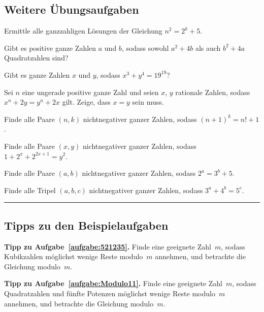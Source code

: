 \subsection*{Weitere Übungsaufgaben}
\begin{aufgabe*}\label{aufgabe:501044}
	Ermittle alle ganzzahligen Lösungen der Gleichung $n^2=2^k+5$.
\end{aufgabe*}
\begin{aufgabe*}
	Gibt es positive ganze Zahlen $a$ und $b$, sodass sowohl $a^2+4b$ als auch $b^2+4a$ Quadratzahlen sind?
\end{aufgabe*}
\begin{aufgabe*}
	Gibt es ganze Zahlen $x$ und $y$, sodass $x^3+y^4=19^{19}$?
\end{aufgabe*}
\begin{aufgabe*}
	Sei $n$ eine ungerade positive ganze Zahl und seien $x$, $y$ rationale Zahlen, sodass $x^n+2y=y^n+2x$ gilt. Zeige, dass $x=y$ sein muss.
\end{aufgabe*}
\begin{aufgabe*}[*]
	Finde alle Paare $(n,k)$ nichtnegativer ganzer Zahlen, sodass $(n+1)^k=n!+1$.
\end{aufgabe*}
\begin{aufgabe*}[*]
	Finde alle Paare $(x,y)$ nichtnegativer ganzer Zahlen, sodass $1+2^x+2^{2x+1}=y^2$.
\end{aufgabe*}
\begin{aufgabe*}[**]
	Finde alle Paare $(a,b)$ nichtnegativer ganzer Zahlen, sodass $2^a=3^b+5$.
\end{aufgabe*}
\begin{aufgabe*}[**]
	Finde alle Tripel $(a,b,c)$ nichtnegativer ganzer Zahlen, sodass $3^a+4^b=5^c$.
\end{aufgabe*}

\vfill\hrule\vspace{-1em}

\subsection*{Tipps zu den Beispielaufgaben}
\textbf{Tipp zu Aufgabe~\ref{aufgabe:521235}.} Finde eine geeignete Zahl~$m$, sodass Kubikzahlen möglichst wenige Reste modulo~$m$ annehmen, und betrachte die Gleichung modulo~$m$.

\textbf{Tipp zu Aufgabe~\ref{aufgabe:Modulo11}.} Finde eine geeignete Zahl~$m$, sodass Quadratzahlen und fünfte Potenzen möglichst wenige Reste modulo~$m$ annehmen, und betrachte die Gleichung modulo~$m$.

